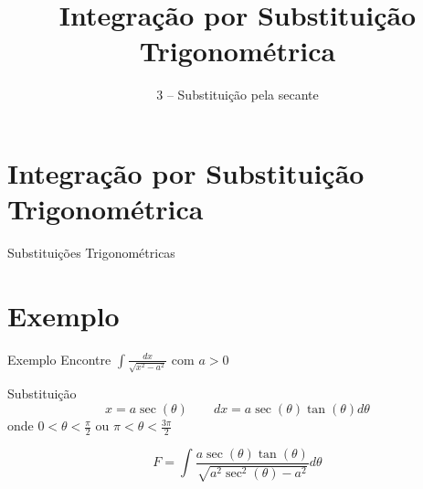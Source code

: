 
\usepackage{integracao_e_series}
\usepackage{ulem}

\title{Integração por Substituição Trigonométrica}
\subtitle{3 -- Substituição pela secante}



\addtitle

\section{Integração por Substituição Trigonométrica}

\begin{frame}{Substituições Trigonométricas}
\end{frame}

\addtocounter{exemplo}{1}
\section{Exemplo \theexemplo}

\begin{frame}{Exemplo \theexemplo}
  Encontre \(\int\!\!\frac{dx}{\sqrt{x^2-a^2}}\) com $a>0$

  \pause
  \vspace{0.5\baselineskip}
  Substituição
  \[
    x = a\sec(\theta)
    \qquad
    dx = a \sec(\theta)\tan(\theta) d\theta
  \]
  onde \(0 < \theta < \frac{\pi}{2}\) ou \(\pi < \theta  < \frac{3\pi}{2}\)

  \pause
  \vspace{0.5\baselineskip}
  \[
    F = \int \frac{ a \sec(\theta) \tan(\theta) }
                  { \sqrt{a^2 \sec^2(\theta) - a^2 }} d\theta
  \]
\end{frame}

